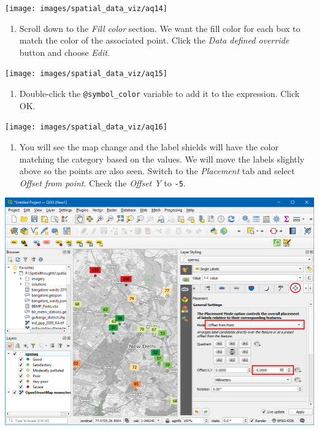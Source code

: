 \documentclass[
  12pt,
  a4paper]{article}
\providecommand{\tightlist}{%
  \setlength{\itemsep}{0pt}\setlength{\parskip}{0pt}}
\begin{document}
\begin{center}\texttt{[image: images/spatial\_data\_viz/aq14]} \end{center}

\begin{enumerate}
\def\labelenumi{\arabic{enumi}.}
\setcounter{enumi}{14}
\tightlist
\item
  Scroll down to the \emph{Fill color} section. We want the fill color
  for each box to match the color of the associated point. Click the
  \emph{Data defined override} button and choose \emph{Edit}.
\end{enumerate}

\begin{center}\texttt{[image: images/spatial\_data\_viz/aq15]} \end{center}

\begin{enumerate}
\def\labelenumi{\arabic{enumi}.}
\setcounter{enumi}{15}
\tightlist
\item
  Double-click the \texttt{@symbol\_color} variable to add it to the
  expression. Click OK.
\end{enumerate}

\begin{center}\texttt{[image: images/spatial\_data\_viz/aq16]} \end{center}

\begin{enumerate}
\def\labelenumi{\arabic{enumi}.}
\setcounter{enumi}{16}
\tightlist
\item
  You will see the map change and the label shields will have the color
  matching the category based on the values. We will move the labels
  slightly above so the points are also seen. Switch to the
  \emph{Placement} tab and select \emph{Offset from point}. Check the
  \emph{Offset Y} to \texttt{-5}.
\end{enumerate}

\begin{center}\includegraphics[width=0.75\linewidth]{images/spatial_data_viz/aq17} \end{center}
\end{document}
